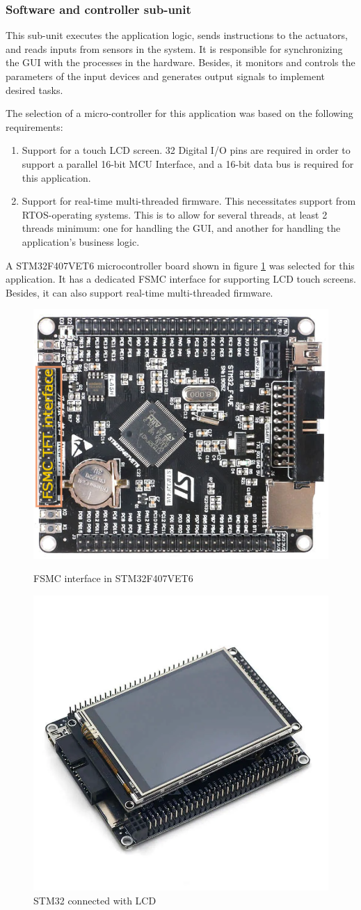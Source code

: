\subsubsection{Software and controller sub-unit}
This sub-unit executes the application logic, sends instructions to the actuators, and reads inputs from sensors in the system. It is responsible for synchronizing the GUI with the processes in the hardware. Besides, it monitors and controls the parameters of the input devices and generates output signals to implement desired tasks.
\par
The selection of a micro-controller for this application was based on the following requirements:
\begin{enumerate}
    \item Support for a touch LCD screen. 32 Digital I/O pins are required in order to support a parallel 16-bit MCU Interface, and a 16-bit data bus is required for this application.
    \item Support for real-time multi-threaded firmware. This necessitates support from RTOS-operating systems. This is to allow for several threads, at least 2 threads minimum: one for handling the GUI, and another for handling the application's business logic.
\end{enumerate}

A STM32F407VET6 microcontroller board shown in figure \ref{fig:fsmc_interface} was selected for this application. It has a dedicated FSMC interface for supporting LCD touch screens. Besides, it can also support real-time multi-threaded firmware.
 \begin{figure}[H]
        \centering
        \includegraphics[width=.45\textwidth, height=.325\textheight]{Figures/STM32F407VET6.png}
        \caption[Load cells circuit]{FSMC interface in STM32F407VET6 \cite{mcu_lcd}}
        \includegraphics[width=.45\textwidth, height=.325\textheight]{Figures/stm32f407vet6_with_lcd.png}
        \caption[STM32 connected with LCD]{STM32 connected with LCD \cite{mcu_lcd}}
        \label{fig:fsmc_interface}
\end{figure}

